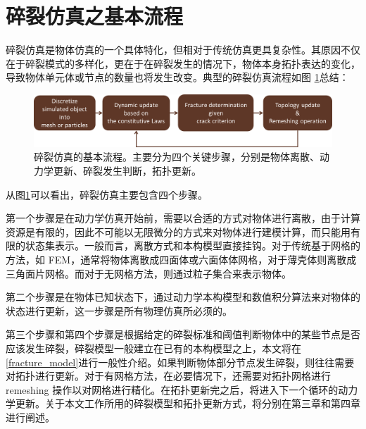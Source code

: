 \section{碎裂仿真之基本流程}
碎裂仿真是物体仿真的一个具体特化，但相对于传统仿真更具复杂性。其原因不仅在于碎裂模式的多样化，更在于在碎裂发生的情况下，物体本身拓扑表达的变化，导致物体单元体或节点的数量也将发生改变。典型的碎裂仿真流程如图
\ref{fig_fracture_animation_pipeline}总结：
\begin{figure}[htbp!]
  \centering
  \captionsetup{justification=centering}
  \includegraphics[width=\linewidth]{chap/image/fracture_animation_pipeline}

  \caption{\label{fig_fracture_animation_pipeline}
           碎裂仿真的基本流程。主要分为四个关键步骤，分别是物体离散、动力学更新、碎裂发生判断，拓扑更新。
          }
\end{figure}

从图\ref{fig_fracture_animation_pipeline}可以看出，碎裂仿真主要包含四个步骤。

第一个步骤是在动力学仿真开始前，需要以合适的方式对物体进行离散，由于计算资源是有限的，因此不可能以无限微分的方式来对物体进行建模计算，而只能用有限的状态集表示。一般而言，离散方式和本构模型直接挂钩。对于传统基于网格的方法，如 FEM，通常将物体离散成四面体或六面体体网格，对于薄壳体则离散成三角面片网格。而对于无网格方法，则通过粒子集合来表示物体。

第二个步骤是在物体已知状态下，通过动力学本构模型和数值积分算法来对物体的状态进行更新，这一步骤是所有物理仿真所必须的。

第三个步骤和第四个步骤是根据给定的碎裂标准和阈值判断物体中的某些节点是否应该发生碎裂，碎裂模型一般建立在已有的本构模型之上，本文将在\ref{fracture_model}进行一般性介绍。如果判断物体部分节点发生碎裂，则往往需要对拓扑进行更新。对于有网格方法，在必要情况下，还需要对拓扑网格进行 remeshing 操作以对网格进行精化。在拓扑更新完之后，将进入下一个循环的动力学更新。关于本文工作所用的碎裂模型和拓扑更新方式，将分别在第三章和第四章进行阐述。

